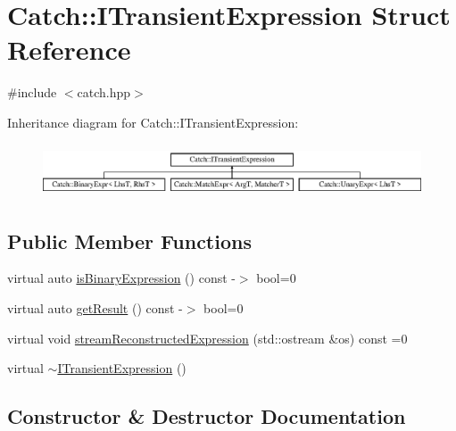 \hypertarget{structCatch_1_1ITransientExpression}{}\section{Catch\+:\+:I\+Transient\+Expression Struct Reference}
\label{structCatch_1_1ITransientExpression}


{\ttfamily \#include $<$catch.\+hpp$>$}

Inheritance diagram for Catch\+:\+:I\+Transient\+Expression\+:\begin{figure}[H]
\begin{center}
\leavevmode
\includegraphics[height=1.588652cm]{structCatch_1_1ITransientExpression}
\end{center}
\end{figure}
\subsection*{Public Member Functions}
\begin{DoxyCompactItemize}
\item 
virtual auto \mbox{\hyperlink{structCatch_1_1ITransientExpression_aa93e6bb9392c8c99c695ec9f0ef147dc}{is\+Binary\+Expression}} () const -\/$>$ bool=0
\item 
virtual auto \mbox{\hyperlink{structCatch_1_1ITransientExpression_ade7e988c982fd6befc47c7154ca0ec6b}{get\+Result}} () const -\/$>$ bool=0
\item 
virtual void \mbox{\hyperlink{structCatch_1_1ITransientExpression_aabe1889df9c6e639a24afb08d8a0fe9e}{stream\+Reconstructed\+Expression}} (std\+::ostream \&os) const =0
\item 
virtual \mbox{\hyperlink{structCatch_1_1ITransientExpression_aeadf426de589938c4964fe4068eeee77}{$\sim$\+I\+Transient\+Expression}} ()
\end{DoxyCompactItemize}


\subsection{Constructor \& Destructor Documentation}
\mbox{\label{structCatch_1_1ITransientExpression_aeadf426de589938c4964fe4068eeee77}} 
